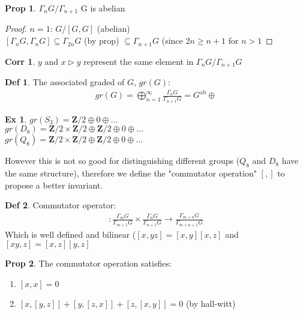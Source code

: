 \documentclass{article}
\theoremstyle{definition}
\newtheorem{definition}{Def}[section]
\newtheorem{proposition}{Prop}[section]
\newtheorem{corrollar}{Corr}[section]
\newtheorem{example}{Ex}[section]
\theoremstyle{remark}
\begin{document}
\begin{proposition}
$\Gamma _n G /\Gamma _{n+1}$ G is abelian
\end{proposition}
\begin{proof}
$n = 1$: $G/[G, G]$ (abelian) \\
$[\Gamma _n G, \Gamma _n G] \subseteq \Gamma _{2n} G$ (by prop) $\subseteq \Gamma _{n+1} G $ (since $2n \geq n + 1$ for $n > 1$
\end{proof}

\begin{corrollar}
$y$ and $x \triangleright y$ represent the same element in $\Gamma _n G / \Gamma _{n+1} G$
\end{corrollar}

\begin{definition}
The associated graded of $G$, $gr(G)$: 
\begin{align*}
    gr(G) = \bigoplus\limits_{n=1}^\infty \frac{\Gamma _n G}{\Gamma _{n+1} G} = G^{\text{ab}} \oplus
\end{align*}
\end{definition}

\begin{example}
$gr(S_3) = \mathbf{Z}/2 \oplus 0 \oplus \ldots $ \\
$gr(D_8) = \mathbf{Z}/2 \times \mathbf{Z}/2 \oplus \mathbf{Z}/2 \oplus 0 \oplus \ldots$ \\
$gr(Q_8) = \mathbf{Z}/2 \times \mathbf{Z}/2 \oplus \mathbf{Z}/2 \oplus 0 \oplus \ldots$
\end{example}

However this is not so good for distinguishing different groups ($Q_8$ and $D_8$ have the same structure), therefore we define the "commutator operation" $[ , ]$ to propose a better invariant.

\begin{definition}
Commutator operator: 
\begin{align*}
    [,]: \frac{\Gamma _m G}{\Gamma _{m+1} G} \times \frac{\Gamma _n G}{\Gamma _{n+1} G} \longrightarrow \frac{\Gamma _{m + n} G}{\Gamma _{m+n + 1} G}
\end{align*}
Which is well defined and bilinear ($[x, yz] = [x, y][x, z]$ and $[xy, z] = [x, z] [y,z]$
\end{definition}

\begin{proposition}
The commutator operation satisfies:
\begin{enumerate}
    \item $[x, x] = 0$
    \item $[x, [y,z]] + [y, [z,x]] + [z, [x, y]] = 0$ (by hall-witt)
\end{enumerate}
\end{proposition}
\end{document}
